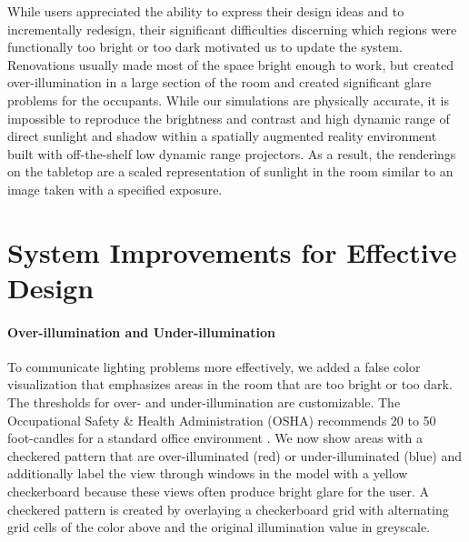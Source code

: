 \documentclass[10pt,twocolumn,letterpaper]{article}
\begin{document}
While users appreciated the ability to express their design ideas and
to incrementally redesign, their significant difficulties discerning
which regions were functionally too bright or too dark 
motivated us to update the system.
%
Renovations usually made most of the space bright enough to work, but
created over-illumination in a large section of the room and created
significant glare problems for the occupants.  While our simulations
are physically accurate, it is impossible to reproduce the brightness
and contrast and high dynamic range of direct sunlight and shadow
within a spatially augmented reality environment built with
off-the-shelf low dynamic range projectors.  As a result, the
renderings on the tabletop are a scaled representation of sunlight in
the room similar to an image taken with a specified exposure.

\section{System Improvements for Effective Design}

%



\paragraph{Over-illumination and Under-illumination}

To communicate lighting problems more effectively, we added a false
color visualization that emphasizes areas in the room that are too
bright or too dark.  The thresholds for over- and under-illumination
are customizable.  The Occupational Safety \& Health Administration
(OSHA) recommends 20 to 50 foot-candles for a standard office
environment \cite{OSHA}.  We now show areas with a checkered pattern
that are over-illuminated (red) or under-illuminated (blue) and
additionally label the view through windows in the model with a yellow
checkerboard because these views often produce bright glare for the
user.  A checkered pattern is created by overlaying a checkerboard
grid with alternating grid cells of the color above and the original
illumination value in greyscale.  
\end{document}
